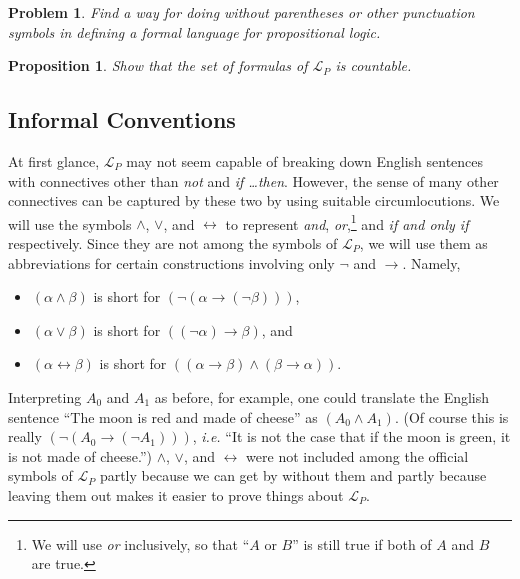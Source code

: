 \documentclass[12pt]{amsbook}
\newcommand{\fromto}{\leftrightarrow}
\theoremstyle{plain}
\newtheorem{prop}[thm]{Proposition}
\newtheorem{prob}[thm]{Problem}
\theoremstyle{definition}
\theoremstyle{remark}
\begin{document}
\begin{prob} \label{p:pn} 
Find a way for doing without parentheses or other punctuation symbols in defining a formal language for propositional logic.
\end{prob}

\begin{prop} \label{p:foc}
Show that the set of formulas of $\mathcal{L}_P$ is countable.
\end{prop}

\subsection*{Informal Conventions}  At first glance,  $\mathcal{L}_P$ may not seem capable of breaking down English sentences with connectives other than {\em not\/} and {\em if \dots then\/}.  However,  the sense of many other connectives can be captured by these two by using suitable circumlocutions.  We will use the symbols $\land$\index{$\land$},  $\lor$\index{$\lor$},  and $\fromto$\index{$\fromto$} to represent {\em and\/},  {\em or\/},\footnote{We will use {\em or\/} inclusively,  so that ``$A$ or $B$'' is still true if both of $A$ and $B$ are true.} and {\em if and only if\/} respectively.  Since they are not among the symbols of $\mathcal{L}_P$,  we will use them as abbreviations for certain constructions involving only $\lnot$ and $\to$.  Namely,  
\begin{itemize}
\item $(\alpha \land \beta)$ is short for $(\lnot (\alpha \to (\lnot \beta)))$, 
\item $(\alpha \lor \beta)$ is short for $( (\lnot \alpha) \to \beta)$,  and 
\item $(\alpha \fromto \beta)$ is short for $((\alpha \to \beta) \land (\beta \to \alpha))$.  
\end{itemize}
Interpreting $A_0$ and $A_1$ as before,  for example,  one could translate the English sentence ``The moon is red and made of cheese'' as $(A_0 \land A_1)$.  (Of course this is really $(\lnot (A_0 \to (\lnot A_1)))$,  {\em i.e.\/}  ``It is not the case that if the moon is green,  it is not made of cheese.'')  $\land$,  $\lor$, and $\fromto$ were not included among the official symbols of $\mathcal{L}_P$ partly because we can get by without them and partly because leaving them out makes it easier to prove things about $\mathcal{L}_P$.
\end{document}
